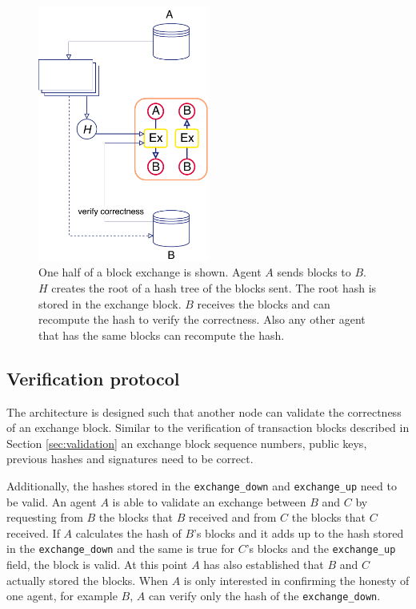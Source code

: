 \begin{figure}[!ht]
    \centering
    \includegraphics[width=0.5\textwidth]{images/trustchain-3.pdf}
    \caption{One half of a block exchange is shown. Agent $A$ sends blocks to $B$. $H$ creates the 
    root of a hash tree of the blocks sent. The root hash is stored in the
    exchange block. $B$ receives the blocks and can recompute the hash to verify the correctness.
    Also any other agent that has the same blocks can recompute the hash.}
    \label{fig:block_exchange}
\end{figure}

\subsection{Verification protocol}
The architecture is designed such that another node can validate the correctness of an exchange
block. Similar to the verification of transaction blocks described in Section \ref{sec:validation} an 
exchange block sequence numbers, public keys, previous hashes and signatures need to be correct. 

Additionally, the hashes stored in the \verb|exchange_down| and \verb|exchange_up| need to be valid.
An agent $A$ is able to validate an exchange between $B$ and $C$ by requesting from $B$ the blocks 
that $B$ received and from $C$ the blocks that $C$ received. If $A$ calculates the hash of $B$'s blocks
and it adds up to the hash stored in the \verb|exchange_down| and the same is true for $C$'s blocks and
the \verb|exchange_up| field, the block is valid. At this point $A$ has also established that $B$ 
and $C$ actually stored the blocks. When $A$ is only interested in confirming the honesty of one 
agent, for example $B$, $A$ can verify only the hash of the \verb|exchange_down|.


